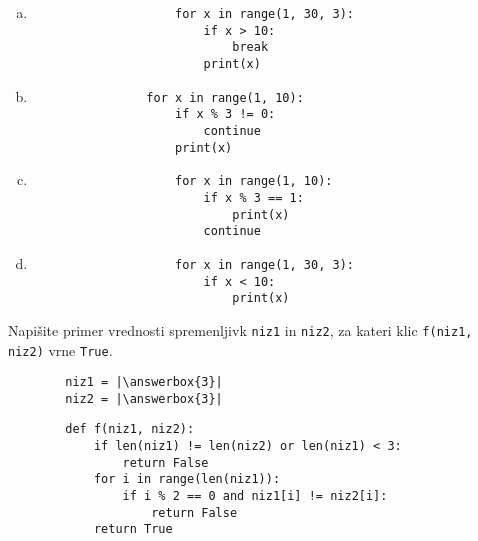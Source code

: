 \documentclass[arhiv, 10pt]{../izpit}
\newcommand{\inlinepy}[1]{\texttt{#1}}
\newcommand{\answerbox}[1]{\framebox{\vphantom{\large M}\hspace{#1cm}}}
\begin{document}
        \begin{multicols}{2}
        \begin{enumerate}[(a)]
\item 
                \begin{verbatim}
                    for x in range(1, 30, 3):
                        if x > 10:
                            break
                        print(x)
                \end{verbatim}
            
\item 
            \begin{verbatim}
                for x in range(1, 10):
                    if x % 3 != 0:
                        continue
                    print(x)
            \end{verbatim}
        
\item 
                \begin{verbatim}
                    for x in range(1, 10):
                        if x % 3 == 1:
                            print(x)
                        continue
                \end{verbatim}
            
\item 
                \begin{verbatim}
                    for x in range(1, 30, 3):
                        if x < 10:
                            print(x)
                \end{verbatim}
            
\end{enumerate}

        \end{multicols}
    
        \naloga*
        \begin{multicols}{2}
        \noindent
        Napišite primer vrednosti spremenljivk \inlinepy{niz1} in \inlinepy{niz2}, za kateri klic \inlinepy{f(niz1, niz2)} vrne \inlinepy{True}.
        \begin{verbatim}
        niz1 = |\answerbox{3}|
        niz2 = |\answerbox{3}|
        \end{verbatim}
        \vfil
        \columnbreak
        \begin{verbatim}
        def f(niz1, niz2):
            if len(niz1) != len(niz2) or len(niz1) < 3:
                return False
            for i in range(len(niz1)):
                if i % 2 == 0 and niz1[i] != niz2[i]:
                    return False
            return True
        \end{verbatim}
        \end{multicols}
    
\end{document}
